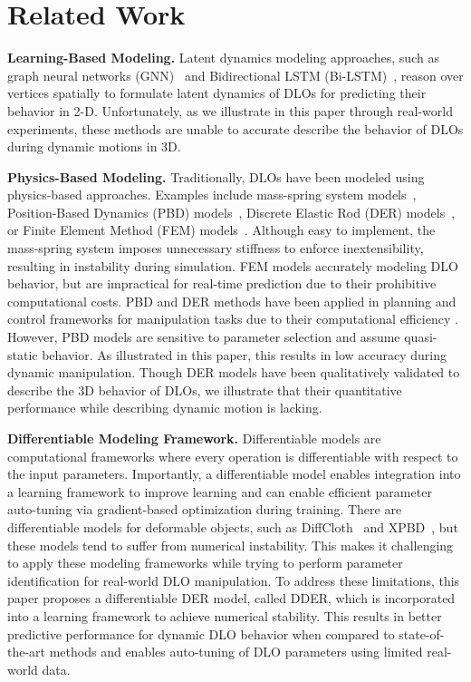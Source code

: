 \section{Related Work}
\label{sec:related_work}

\textbf{Learning-Based Modeling.}
Latent dynamics modeling approaches, such as graph neural networks (GNN)~\cite{GNN_baseline} and Bidirectional LSTM (Bi-LSTM)~\cite{bi-LSTM_baseline}, reason over vertices spatially to formulate latent dynamics of DLOs for predicting their behavior in 2-D.
Unfortunately, as we illustrate in this paper through real-world experiments, these methods are unable to accurate describe the behavior of DLOs during dynamic motions in 3D.

\textbf{Physics-Based Modeling.}
Traditionally, DLOs have been modeled using physics-based approaches.
Examples include mass-spring system models~\cite{LargeStepSimulation, diffcloth, Liu:2013:FSM},  Position-Based Dynamics (PBD) models~\cite{directionalrigidity, diminishingridgidity, xpbd},  Discrete Elastic Rod (DER) models~\cite{originalDER, originalDER2, DERapp1, DERapp2}, or Finite Element Method (FEM) models~\cite{garcia2006optimized, sin2013vega, koessler2021efficient}.
Although easy to implement, the mass-spring system imposes unnecessary stiffness to enforce inextensibility, resulting in instability during simulation.
FEM models accurately modeling DLO behavior, but are impractical for real-time prediction due to their prohibitive computational costs.
PBD and DER methods have been applied in planning and control frameworks for manipulation tasks due to their computational efficiency \cite{diminishingridgidity, xpbd, DER_manipulation1, DER_manipulation2, DER_manipulation3}.
However, PBD models are sensitive to parameter selection and assume quasi-static behavior.
As illustrated in this paper, this results in low accuracy during dynamic manipulation.
Though DER models have been qualitatively validated to describe the 3D behavior of DLOs, we illustrate that their quantitative performance while describing dynamic motion is lacking.

\textbf{Differentiable Modeling Framework.} 
Differentiable models are computational frameworks where every operation is differentiable with respect to the input parameters.
Importantly, a differentiable model enables integration into a learning framework to improve learning and can enable efficient parameter auto-tuning via gradient-based optimization during training.
There are differentiable models for deformable objects, such as DiffCloth~\cite{LargeStepSimulation, diffcloth} and XPBD~\cite{xpbd}, but these models tend to suffer from numerical instability.
This makes it challenging to apply these modeling frameworks while trying to perform parameter identification for real-world DLO manipulation.
To address these limitations, this paper proposes a differentiable DER model, called DDER, which is incorporated into a learning framework to achieve numerical stability.
This results in better predictive performance for dynamic DLO behavior when compared to state-of-the-art methods and enables auto-tuning of DLO parameters using limited real-world data.


